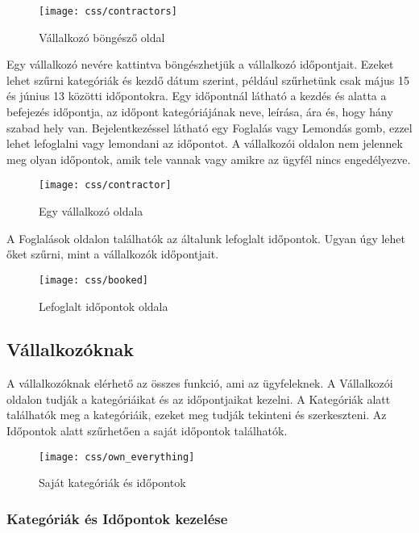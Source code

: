 \begin{figure}[H]
    \centering
    \texttt{[image: css/contractors]}
    \caption{Vállalkozó böngésző oldal}
\end{figure}

Egy vállalkozó nevére kattintva böngészhetjük a vállalkozó időpontjait. Ezeket lehet szűrni kategóriák és kezdő dátum szerint, például szűrhetünk csak május 15 és június 13 közötti időpontokra. Egy időpontnál látható a kezdés és alatta a befejezés időpontja, az időpont kategóriájának neve, leírása, ára és, hogy hány szabad hely van. Bejelentkezéssel látható egy Foglalás vagy Lemondás gomb, ezzel lehet lefoglalni vagy lemondani az időpontot. A vállalkozói oldalon nem jelennek meg olyan időpontok, amik tele vannak vagy amikre az ügyfél nincs engedélyezve.

\begin{figure}[H]
    \centering
    \texttt{[image: css/contractor]}
    \caption{Egy vállalkozó oldala}
\end{figure}

A Foglalások oldalon találhatók az általunk lefoglalt időpontok. Ugyan úgy lehet őket szűrni, mint a vállalkozók időpontjait.

\begin{figure}[H]
    \centering
    \texttt{[image: css/booked]}
    \caption{Lefoglalt időpontok oldala}
\end{figure}

\clearpage

\subsection{Vállalkozóknak}

A vállalkozóknak elérhető az összes funkció, ami az ügyfeleknek. A Vállalkozói oldalon tudják a kategóriáikat és az időpontjaikat kezelni. A Kategóriák alatt találhatók meg a kategóriáik, ezeket meg tudják tekinteni és szerkeszteni. Az Időpontok alatt szűrhetően a saját időpontok találhatók.

\begin{figure}[H]
    \centering
    \texttt{[image: css/own\_everything]}
    \caption{Saját kategóriák és időpontok}
\end{figure}

\clearpage

\subsubsection{Kategóriák és Időpontok kezelése}

